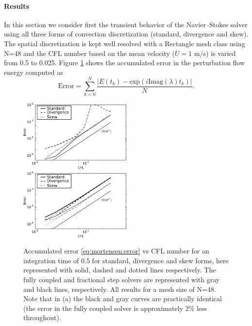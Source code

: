 \paragraph{Results}

In this section we consider first the transient behavior of the
Navier--Stokes solver using all three forms of convection discretization
(standard, divergence and skew). The spatial discretization is kept
well resolved with a Rectangle mesh class using N=48 and the CFL number
based on the mean velocity ($\overline{U}=1$ m/s) is varied from 0.5
to 0.025. Figure \ref{fig:mortensen:OS_init_cfl} shows the accumulated
error in the perturbation flow energy computed as
\begin{equation}
 \text{Error} = \sum_{k=0}^N \frac{|E(t_k)-\text{exp}(i \text{Imag}(\lambda) t_k)|}{N}.
 \label{eq:mortensen:error}
\end{equation}
\begin{figure}
 \includegraphics[width=0.5\textwidth]{chapters/mortensen/pdf/OS_init_cfl_1.pdf}
 \includegraphics[width=0.5\textwidth]{chapters/mortensen/pdf/OS_init_cfl_0.pdf}
 \caption{Accumulated error \eqref{eq:mortensen:error} vs CFL number
   for an integration time of 0.5 for standard, divergence and skew
   forms, here represented with solid, dashed and dotted lines
   respectively. The fully coupled and fractional step solvers are
   represented with gray and black lines, respectively. All results
   for a mesh size of N=48. Note that in (a) the black and gray curves
   are practically identical (the error in the fully coupled solver is
   approximately 2\% less throughout). }
\label{fig:mortensen:OS_init_cfl}
\end{figure}
